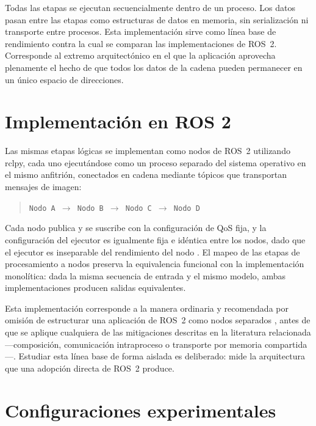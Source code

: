 Todas las etapas se ejecutan secuencialmente dentro de un proceso. Los datos
pasan entre las etapas como estructuras de datos en memoria, sin
serialización ni transporte entre procesos. Esta implementación sirve como
línea base de rendimiento contra la cual se comparan las implementaciones de
ROS~2. Corresponde al extremo arquitectónico en el que la aplicación
aprovecha plenamente el hecho de que todos los datos de la cadena pueden
permanecer en un único espacio de direcciones.

\section{Implementación en ROS 2}
\label{sec:ros2-implementation}

Las mismas etapas lógicas se implementan como nodos de ROS~2 utilizando
rclpy, cada uno ejecutándose como un proceso separado del sistema operativo
en el mismo anfitrión, conectados en cadena mediante tópicos que
transportan mensajes de imagen:

\begin{quote}
\texttt{Nodo A $\rightarrow$ Nodo B $\rightarrow$ Nodo C $\rightarrow$
Nodo D}
\end{quote}

Cada nodo publica y se suscribe con la configuración de QoS fija, y la
configuración del ejecutor es igualmente fija e idéntica entre los nodos,
dado que el ejecutor es inseparable del rendimiento del nodo
\cite{macenski2023, casini2026}. El mapeo de las etapas de procesamiento a
nodos preserva la equivalencia funcional con la implementación monolítica:
dada la misma secuencia de entrada y el mismo modelo, ambas implementaciones
producen salidas equivalentes.

Esta implementación corresponde a la manera ordinaria y recomendada por
omisión de estructurar una aplicación de ROS~2 como nodos separados
\cite{macenski2022}, antes de que se aplique cualquiera de las mitigaciones
descritas en la literatura relacionada---composición, comunicación
intraproceso o transporte por memoria compartida \cite{macenski2023,
kamiya2025}---. Estudiar esta línea base de forma aislada es deliberado:
mide la arquitectura que una adopción directa de ROS~2 produce.

\section{Configuraciones experimentales}
\label{sec:configurations}

